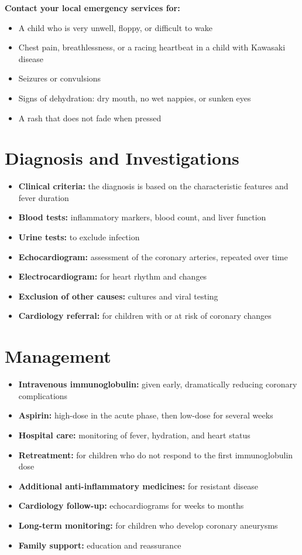 \textbf{Contact your local emergency services for:}
\begin{itemize}
    \item A child who is very unwell, floppy, or difficult to wake
    \item Chest pain, breathlessness, or a racing heartbeat in a child with Kawasaki disease
    \item Seizures or convulsions
    \item Signs of dehydration: dry mouth, no wet nappies, or sunken eyes
    \item A rash that does not fade when pressed
\end{itemize}

\section*{Diagnosis and Investigations}
\begin{itemize}
    \item \textbf{Clinical criteria:} the diagnosis is based on the characteristic features and fever duration
    \item \textbf{Blood tests:} inflammatory markers, blood count, and liver function
    \item \textbf{Urine tests:} to exclude infection
    \item \textbf{Echocardiogram:} assessment of the coronary arteries, repeated over time
    \item \textbf{Electrocardiogram:} for heart rhythm and changes
    \item \textbf{Exclusion of other causes:} cultures and viral testing
    \item \textbf{Cardiology referral:} for children with or at risk of coronary changes
\end{itemize}

\section*{Management}
\begin{itemize}
    \item \textbf{Intravenous immunoglobulin:} given early, dramatically reducing coronary complications
    \item \textbf{Aspirin:} high-dose in the acute phase, then low-dose for several weeks
    \item \textbf{Hospital care:} monitoring of fever, hydration, and heart status
    \item \textbf{Retreatment:} for children who do not respond to the first immunoglobulin dose
    \item \textbf{Additional anti-inflammatory medicines:} for resistant disease
    \item \textbf{Cardiology follow-up:} echocardiograms for weeks to months
    \item \textbf{Long-term monitoring:} for children who develop coronary aneurysms
    \item \textbf{Family support:} education and reassurance
\end{itemize}

